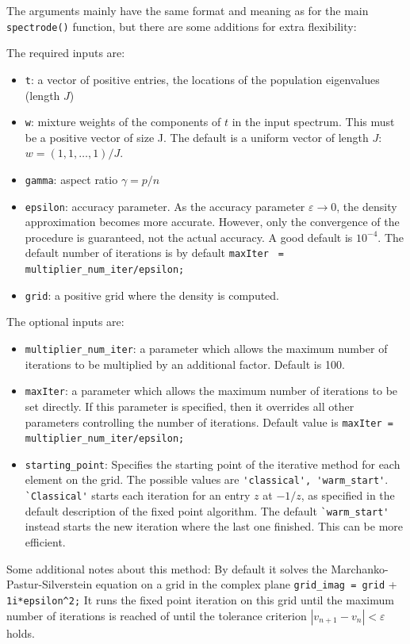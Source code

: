 \documentclass[english,11pt]{article} %
\begin{document}
 The arguments mainly have the same format and meaning as for the main \verb+spectrode()+ function, but there are some additions for extra flexibility:  
 
 The required inputs are: 
\begin{itemize}
\item \verb+t+:  a vector of positive entries, the locations of the population eigenvalues (length $J$)
\item \verb+w+: mixture weights of the components of $t$ in the input spectrum. This must be a positive vector of size J. The default is a uniform vector of length $J$: $w = (1,1,\ldots,1)/J$.
\item \verb+gamma+:  aspect ratio $\gamma = p/n$
\item \verb+epsilon+: accuracy parameter. As the accuracy parameter $\varepsilon \to 0$, the density approximation becomes more accurate. However, only the convergence of the procedure is guaranteed, not the actual accuracy. A good default is $10^{-4}$. The default number of iterations is by default \verb+maxIter+ \verb+ = multiplier_num_iter/epsilon;+
\item \verb+grid+: a positive grid where the density is computed. 
\end{itemize}

 The optional inputs are: 
 
\begin{itemize}
\item \verb+multiplier_num_iter+: a parameter which allows the maximum number of iterations to be multiplied by an additional factor. Default is 100.
\item \verb+maxIter+: a parameter which allows the maximum number of iterations to be set directly. If this parameter is specified, then it overrides all other parameters controlling the number of iterations.  Default value is \verb+maxIter = multiplier_num_iter/epsilon;+
\item \verb+starting_point+: Specifies the starting point of the iterative method for each element on the grid. The possible values are \verb+'classical', 'warm_start'+. \verb+`Classical'+ starts each iteration for an entry $z$ at $-1/z$, as specified in the default description of the fixed point algorithm. The default \verb+`warm_start'+ instead starts the new iteration where the last one finished. This can be more efficient.
\end{itemize} 
 
Some additional notes about this method: By default it solves the Marchanko-Pastur-Silverstein equation on a grid in the complex plane \verb+grid_imag = grid+ + \verb+  1i*epsilon^2;+ It runs the fixed point iteration on this grid until the maximum number of iterations is reached of until the tolerance criterion $|v_{n+1}-v_n|<\varepsilon$ holds. 
\end{document}

